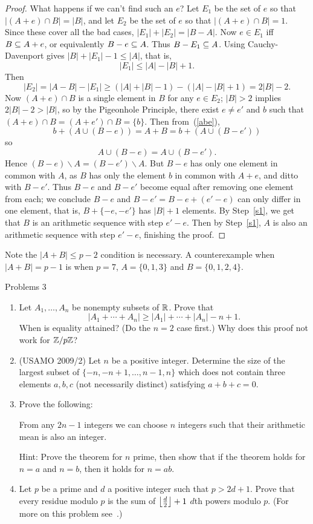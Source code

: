 \begin{proof}
What happens if we can't find such an $e$? Let $E_1$ be the set of $e$ so that $|(A+e)\cap B|=|B|$, and let $E_2$ be the set of $e$ so that $|(A+e)\cap B|=1$. Since these cover all the bad cases, $|E_1|+|E_2|=|B-A|$. 
Now $e\in E_1$ iff $B\subseteq A+e$, or equivalently $B-e\subseteq A$. Thus $B-E_1\subseteq A$. Using Cauchy-Davenport gives $|B|+|E_1|-1\leq |A|$, that is, \[|E_1|\leq |A|-|B|+1.\]
Then
\[|E_2|=|A-B|-|E_1|\geq (|A|+|B|-1)-(|A|-|B|+1)=2|B|-2.\]
Now $(A+e)\cap B$ is a single element in $B$ for any $e\in E_2$; $|B|>2$ implies $2|B|-2>|B|$, so by the Pigeonhole Principle, there exist $e\neq  e'$ and $b$ such that $(A+e)\cap B=(A+e')\cap B=\{b\}$. Then from~(\ref{abe}), 
\[b+(A\cup (B-e))=A+B=b+(A\cup (B-e'))\]
so
\[
A\cup (B-e)=A\cup (B-e').
\]
Hence $(B-e)\backslash A=(B-e')\backslash A$. 
But $B-e$ has only one element in common with $A$, as $B$ has only the element $b$ in common with $A+e$, and ditto with $B-e'$. Thus $B-e$ and $B-e'$ become equal after removing one element from each; we conclude $B-e$ and $B-e'=B-e+(e'-e)$ can only differ in one element, that is, $B+\{-e,-e'\}$ has $|B|+1$ elements. By Step~\ref{s1}, we get that $B$ is an arithmetic sequence with step $e'-e$. Then by Step~\ref{s1}, $A$ is also an arithmetic sequence with step $e'-e$, finishing the proof.
\end{proof}
\begin{rem}
Note the $|A+B|\leq p-2$ condition is necessary. A counterexample when $|A+B|=p-1$ is when $p=7$, $A=\{0,1,3\}$ and $B=\{0,1,2,4\}$.
\end{rem}
{\Large Problems 3}
\begin{enumerate}
\item Let $A_1,\ldots, A_n$ be nonempty subsets of $\mathbb{R}$. Prove that
\[
|A_1+\cdots +A_n|\geq |A_1|+\cdots +|A_n|-n+1.
\]
When is equality attained? (Do the $n=2$ case first.)
Why does this proof not work for $\mathbb{Z}/p\mathbb{Z}$?
\item
(USAMO 2009/2) Let $n$ be a positive integer. Determine the size of the largest subset of $\{-n,-n+1,\ldots, n-1,n\}$ which does not contain three elements $a,b,c$ (not necessarily distinct) satisfying $a+b+c=0$.
\item Prove the following:
\begin{thm}
From any $2n-1$ integers we can choose $n$ integers such that their arithmetic mean is also an integer.
\end{thm}
Hint: Prove the theorem for $n$ prime, then show that if the theorem holds for $n=a$ and $n=b$, then it holds for $n=ab$. 
\item Let $p$ be a prime and $d$ a positive integer such that $p>2d+1$. Prove that every residue modulo $p$ is the sum of $\left\lfloor {\frac d2}\right\rfloor+1$ $d$th powers modulo $p$. (For more on this problem see~\cite{Lee}.)
\end{enumerate}
\pagebreak
